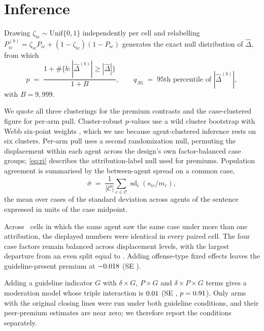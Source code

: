 \section{Inference}
\label{app:inference}

Drawing $\zeta_{ic} \sim \mathrm{Unif}\{0,1\}$ independently per cell and relabelling
$P^{(b)}_{ic} = \zeta_{ic} P_{ic} + (1-\zeta_{ic})(1 - P_{ic})$ generates the exact null
distribution of $\hat\Delta$, from which
\begin{equation}
p \;=\; \frac{1 + \#\{b : |\hat\Delta^{(b)}| \ge |\hat\Delta|\}}{1 + B},
\qquad
q_{.95} \;=\; \text{95th percentile of } |\hat\Delta^{(b)}|,
\label{eq:ri}
\end{equation}
with $B = 9{,}999$.

We quote all three clusterings for the premium contrasts and the case-clustered figure for per-arm
pull. Cluster-robust $p$-values use a wild cluster bootstrap with Webb six-point weights
\citep{webb2023reworking,cameron2008bootstrap,roodman2019fast}, which we use because
agent-clustered inference rests on six clusters. Per-arm pull uses a second randomization null,
permuting the displacement within each agent across the design's own factor-balanced case groups;
\eqref{eq:ri} describes the attribution-label null used for premiums. Population agreement is
summarised by the between-agent spread on a common case,
\begin{equation}
\bar{\sigma} \;=\; \frac{1}{|\mathcal{C}|}\sum_{c \in \mathcal{C}}
\operatorname{sd}_{i}\!\left( s_{ic} / m_c \right),
\label{eq:spread}
\end{equation}
the mean over cases of the standard deviation across agents of the sentence expressed in units of
the case midpoint.

Across \yokedCells\ cells in which the same agent saw the same case under more than one
attribution, the displayed numbers were identical in every paired cell. The four
case factors remain balanced across displacement levels, with the largest departure from an even
split equal to \worstImbalance. Adding offense-type fixed effects leaves the guideline-present
premium at $-0.018$ (SE \rbGTypese).

Adding a guideline indicator $G$ with $\delta \times G$, $P \times G$ and $\delta \times P \times
G$ terms gives a moderation model whose triple interaction is $0.01$ (SE \triplese,
$p=0.91$). Only arms with the original closing lines were run under both guideline conditions,
and their peer-premium estimates are near zero; we therefore report the conditions separately.

